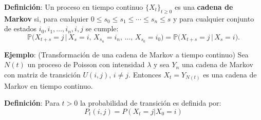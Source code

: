 \documentclass[12pt,a4paper]{article}
\newcommand{\definicion}[1]{%
\begin{definicionbox}
\textbf{Definición}: #1
\end{definicionbox}
}
\begin{document}
\definicion{Un proceso en tiempo continuo $\{X_t\}_{t \geq 0}$ es una \textbf{cadena de Markov} si, 
para cualquier $0 \leq s_0 \leq s_1 \leq \cdots \leq s_n \leq s$ y para cualquier conjunto de estados $i_0, i_1, \dots, i_n, i, j$ se cumple:
\begin{equation*}
\mathbb{P}\bigl(X_{t+s} = j \,\big|\, X_s = i,\, X_{s_n} = i_n,\, \dots,\, X_{s_0} = i_0 \bigr)
= 
\mathbb{P}\bigl(X_{t+s} = j \,\big|\, X_s = i \bigr).
\end{equation*}}

\textbf{Ejemplo}: (Transformación de una cadena de Markov a tiempo continuo) Sea $N(t)$ un proceso de Poisson con intensidad $\lambda$ y sea $Y_n$ una cadena de Markov con matriz de transición $U(i,j)$, $i \neq j$. Entonces $X_t = Y_{N(t)}$ es una cadena de Markov en tiempo continuo.

\begin{center}
\end{center}

\begin{center}
\end{center}

\definicion{Para $t > 0$ la probabilidad de transición es definida por:
\begin{equation*}
P_t(i,j) = P(X_t = j | X_0 = i)
\end{equation*}}
\end{document}
